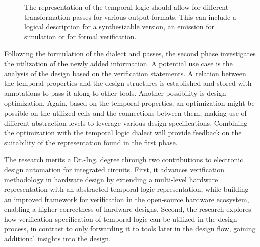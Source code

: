\documentclass[11pt,DIV=16,parskip=half]{scrartcl}
\begin{document}
\begin{figure}
  \caption{The representation of the temporal logic should allow for different
  transformation passes for various output formats. This can include a logical
  description for a synthesizable version, an emission for simulation or for
  formal verification.}\label{fig:svaTransformations}
\end{figure}

Following the formulation of the dialect and passes, the second phase
investigates the utilization of the newly added information.
A potential use case is the analysis of the design based on the verification
statements.
A relation between the temporal properties and the design structures is
established and stored with annotations to pass it along to other tools.
Another possibility is design optimization.
Again, based on the temporal properties, an optimization might be possible on
the utilized cells and the connections between them, making use of different
abstraction levels to leverage various design specifications.
Combining the optimization with the temporal logic dialect will provide
feedback on the suitability of the representation found in the first phase.

The research merits a Dr.-Ing. degree through two contributions to electronic
design automation for integrated circuits.
First, it advances verification methodology in hardware design by extending a
multi-level hardware representation with an abstracted temporal logic
representation, while building an improved framework for verification in the
open-source hardware ecosystem, enabling a higher correctness of hardware
designs.
Second, the research explores how verification specification of temporal logic
can be utilized in the design process, in contrast to only forwarding it to
tools later in the design flow, gaining additional insights into the design.

\printbibliography
\end{document}

